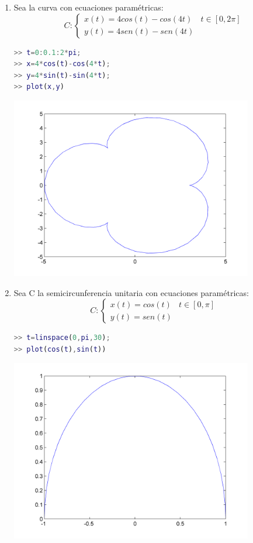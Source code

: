 \begin{enumerate}

\item Sea la curva con ecuaciones paramétricas:
$$
C : \left \{ \begin{matrix} x(t) = 4cos(t) - cos(4t) & t \in [0,2\pi]
\\ y(t) = 4sen(t) - sen(4t) \end{matrix}\right. 
$$
\begin{lstlisting}[language=Matlab]
>> t=0:0.1:2*pi; 
>> x=4*cos(t)-cos(4*t);  
>> y=4*sin(t)-sin(4*t);  
>> plot(x,y)
\end{lstlisting}
\begin{center}
\includegraphics[width=300pt]{./Imagenes/param1.png}
\end{center}

\item Sea C la semicircunferencia unitaria con ecuaciones paramétricas:
$$
C : \left \{ \begin{matrix} x(t) = cos(t) & t \in [0,\pi]
\\ y(t) = sen(t) \end{matrix}\right. 
$$
\begin{lstlisting}[language=Matlab]
>> t=linspace(0,pi,30); 
>> plot(cos(t),sin(t))
\end{lstlisting}
\begin{center}
\includegraphics[width=300pt]{./Imagenes/param2.png}
\end{center} 



\end{enumerate}
